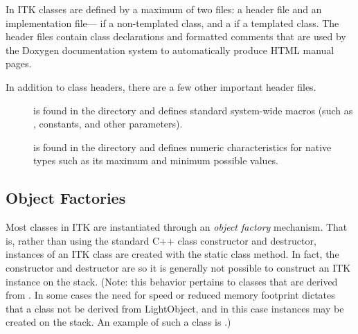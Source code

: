 In ITK classes are defined by a maximum of two files: a header  file
and an implementation file--- if a non-templated class, and a
 if a templated class.
The header files contain class declarations
and formatted comments that are used by the Doxygen documentation
system to automatically produce HTML manual pages.

In addition to class headers, there are a few other important header files.
\begin{description}
        \item[] is found in the
         directory
        and defines standard system-wide macros (such as ,
        constants, and other parameters).

        \item[] is found in the
         directory and defines numeric
        characteristics for native types such as its maximum and minimum
        possible values.
\end{description}

\subsection{Object Factories}
\label{sec:ObjectFactories}


Most classes in ITK are instantiated through an \emph{object factory}
mechanism. That is, rather than using the standard C++ class constructor and
destructor, instances of an ITK class are created with the static class
 method. In fact, the constructor and destructor are
 so it is generally not possible to construct an ITK
instance on the stack. (Note: this behavior pertains to classes that are
derived from . In some cases the need for speed or
reduced memory footprint dictates that a class not be derived from
LightObject, and in this case instances may be created on the stack. An
example of such a class is .)

